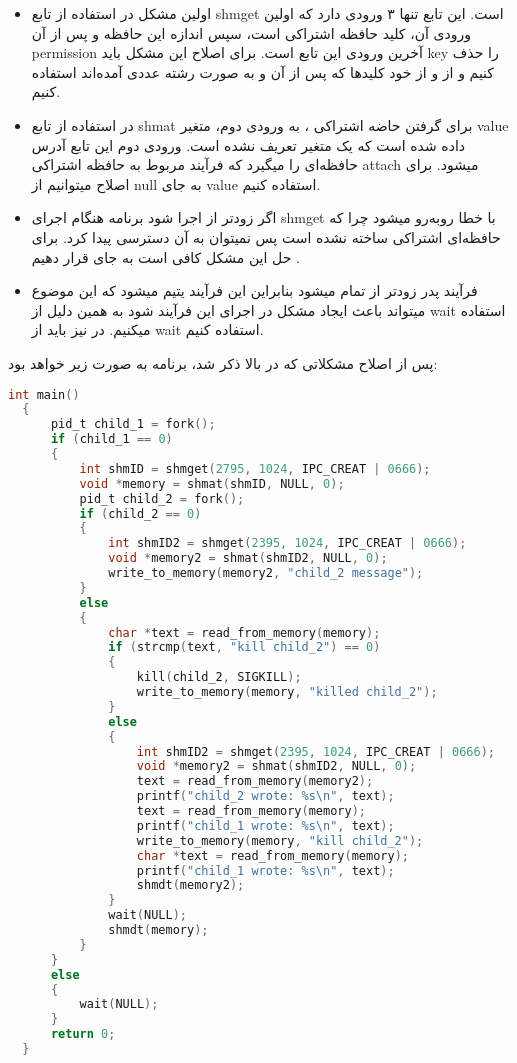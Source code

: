 \documentclass[]{article}
\begin{document}
\begin{itemize}
    \renewcommand\labelitemi{-}
    \item اولین مشکل در استفاده از تابع shmget است.
          این تابع تنها ۳ ورودی دارد که اولین ورودی آن، کلید حافظه اشتراکی است،
          سپس اندازه این حافظه و پس از آن permission آخرین ورودی این تابع است.
          برای اصلاح این مشکل باید key را حذف کنیم و از و از خود کلیدها
          که پس از آن و به صورت رشته عددی آمده‌اند استفاده کنیم.
    \item در استفاده از تابع shmat برای گرفتن حاضه اشتراکی
          ،
          به ورودی دوم، متغیر value داده شده است که یک متغیر تعریف نشده است.
          ورودی دوم این تابع آدرس حافظه‌ای را میگیرد که فرآیند مربوط به حافظه اشتراکی attach میشود.
          برای اصلاح میتوانیم از null به جای value استفاده کنیم.
    \item اگر  زودتر از 
          اجرا شود برنامه هنگام اجرای shmget
          با خطا روبه‌رو میشود چرا که حافظه‌ای اشتراکی 
          ساخته نشده است پس نمیتوان به آن دسترسی پیدا کرد.
          برای حل این مشکل کافی است به جای  قرار دهیم .
    \item فرآیند پدر زودتر از  تمام میشود بنابراین این فرآیند یتیم میشود
          که این موضوع میتواند باعث ایجاد مشکل در اجرای این فرآیند شود به همین دلیل از wait
          استفاده میکنیم. در  نیز باید از wait استفاده کنیم.
\end{itemize}
پس از اصلاح مشکلاتی که در بالا ذکر شد، برنامه به صورت زیر خواهد بود:
\begin{latin}
    \begin{lstlisting}[language=C]
  int main()
  {
      pid_t child_1 = fork();
      if (child_1 == 0)
      {
          int shmID = shmget(2795, 1024, IPC_CREAT | 0666);
          void *memory = shmat(shmID, NULL, 0);
          pid_t child_2 = fork();
          if (child_2 == 0)
          {
              int shmID2 = shmget(2395, 1024, IPC_CREAT | 0666);
              void *memory2 = shmat(shmID2, NULL, 0);
              write_to_memory(memory2, "child_2 message");
          }
          else
          {
              char *text = read_from_memory(memory);
              if (strcmp(text, "kill child_2") == 0)
              {
                  kill(child_2, SIGKILL);
                  write_to_memory(memory, "killed child_2");
              }
              else
              {
                  int shmID2 = shmget(2395, 1024, IPC_CREAT | 0666);
                  void *memory2 = shmat(shmID2, NULL, 0);
                  text = read_from_memory(memory2);
                  printf("child_2 wrote: %s\n", text);
                  text = read_from_memory(memory);
                  printf("child_1 wrote: %s\n", text);
                  write_to_memory(memory, "kill child_2");
                  char *text = read_from_memory(memory);
                  printf("child_1 wrote: %s\n", text);
                  shmdt(memory2);
              }
              wait(NULL);
              shmdt(memory);
          }
      }
      else
      {
          wait(NULL);
      }
      return 0;
  }
\end{lstlisting}
\end{latin}
\end{document}
